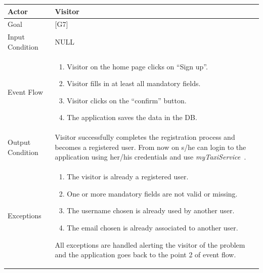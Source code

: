 \documentclass[a4paper,11pt]{report} %
\newcommand{\mts}{\mbox{\normalfont\itshape myTaxiService\ }}
\begin{document}
	\begin{center}
		\begin{tabular}{| l | p{9cm} |}\hline
			Actor & Visitor\\\hline
			Goal & {[}G7{]} \\\hline
			Input Condition & NULL\\\hline
			Event Flow & \begin{enumerate}
							\item Visitor on the home page clicks on ``Sign up''.
							\item Visitor fills in at least all mandatory fields.
							\item Visitor clicks on the ``confirm'' button.
							\item The application saves the data in the DB.
						 \end{enumerate}\\\hline
			Output Condition & Visitor successfully completes the registration process and
								becomes a registered user. From now on s/he can login to
								the application using her/his credentials and use \mts.\\\hline
			Exceptions & {\begin{enumerate}
							\item The visitor is already a registered user.
							\item One or more mandatory fields are not valid or missing.
							\item The username chosen is already used by another user.
							\item The email chosen is already associated to another user.
						  \end{enumerate} All exceptions are handled alerting the visitor of the
						problem and the application goes back to the point 2 of	event flow.}\\\hline
		\end{tabular}
	\end{center}
\end{document}
